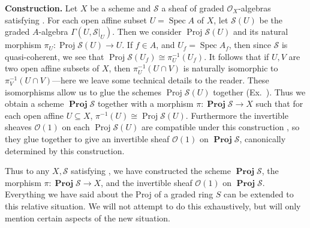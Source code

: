 {\medskip
\noindent\textbf{Construction.} Let $X$ be a scheme and $\mathcal S$ a sheaf of graded $\mathcal O_X$-algebras satisfying . For each open affine subset $U=\operatorname{Spec}A$ of $X$, let $\mathcal S(U)$ be the graded $A$-algebra $\Gamma(U,\mathcal S|_U)$. Then we consider $\operatorname{Proj}\mathcal S(U)$ and its natural morphism $\pi_U\colon\operatorname{Proj}\mathcal S(U)\to U$. If $f\in A$, and $U_f=\operatorname{Spec}A_f$, then since $\mathcal S$ is quasi-coherent, we see that $\operatorname{Proj}\mathcal S(U_f)\cong\pi_U^{-1}(U_f)$. It follows that if $U,V$ are two open affine subsets of $X$, then $\pi_U^{-1}(U\cap V)$ is naturally isomorphic to $\pi_V^{-1}(U\cap V)$---here we leave some technical details to the reader. These isomorphisms allow us to glue the schemes $\operatorname{Proj}\mathcal S(U)$ together (Ex.~). Thus we obtain a scheme $\operatorname{\mathbf{Proj}}\mathcal S$ together with a morphism $\pi\colon\operatorname{\mathbf{Proj}}\mathcal S\to X$ such that for each open affine $U\subseteq X$, $\pi^{-1}(U)\cong\operatorname{Proj}\mathcal S(U)$. Furthermore the invertible sheaves $\mathcal O(1)$ on each $\operatorname{Proj}\mathcal S(U)$ are compatible under this construction , so they glue together to give an invertible sheaf $\mathcal O(1)$ on $\operatorname{\mathbf{Proj}}\mathcal S$, canonically determined by this construction.

\medskip
Thus to any $X,\mathcal S$ satisfying , we have constructed the scheme $\operatorname{\mathbf{Proj}}\mathcal S$, the morphism $\pi\colon\operatorname{\mathbf{Proj}}\mathcal S\to X$, and the invertible sheaf $\mathcal O(1)$ on $\operatorname{\mathbf{Proj}}\mathcal S$. Everything we have said about the Proj of a graded ring $S$ can be extended to this relative situation. We will not attempt to do this exhaustively, but will only mention certain aspects of the new situation.
}

